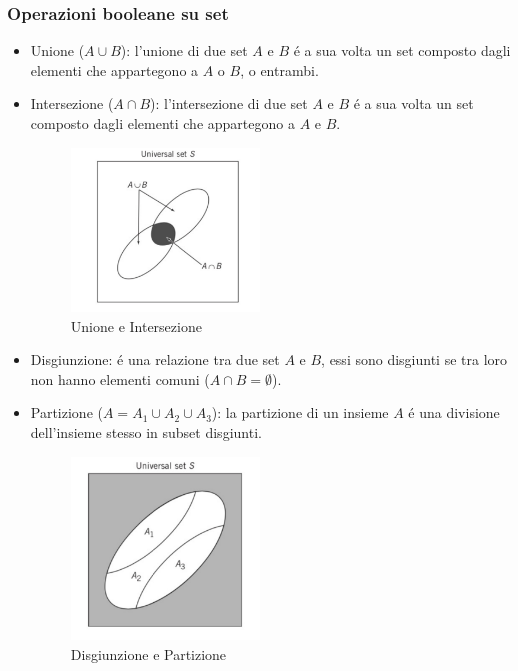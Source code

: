         \subsubsection{Operazioni booleane su set}
            \begin{itemize}
                \item {Unione ($A\cup B$): l'unione di due set $A$ e $B$ é a sua volta un set composto dagli elementi che appartegono a $A$ o $B$, o entrambi.}
                \item {Intersezione ($A\cap B$): l'intersezione di due set $A$ e $B$ é a sua volta un set composto dagli elementi che appartegono a $A$ e $B$.
                \begin{figure}[H]
                    \centering
                    \includegraphics[width = 5cm]{media/Unione_Intersezione.png}
                    \caption{Unione e Intersezione} 
                \end{figure}
                }
                \item {Disgiunzione: é una relazione tra due set $A$ e $B$, essi sono disgiunti se tra loro non hanno elementi comuni ($A\cap B = \emptyset $).}
                \item {Partizione ($A = A_1\cup A_2\cup A_3$): la partizione di un insieme $A$ é una divisione dell'insieme stesso in subset disgiunti.
                \begin{figure}[H]
                    \centering
                    \includegraphics[width = 5cm]{media/Insiemi_distinti.png}
                    \caption{Disgiunzione e Partizione} 
                \end{figure}
}
\end{itemize}
